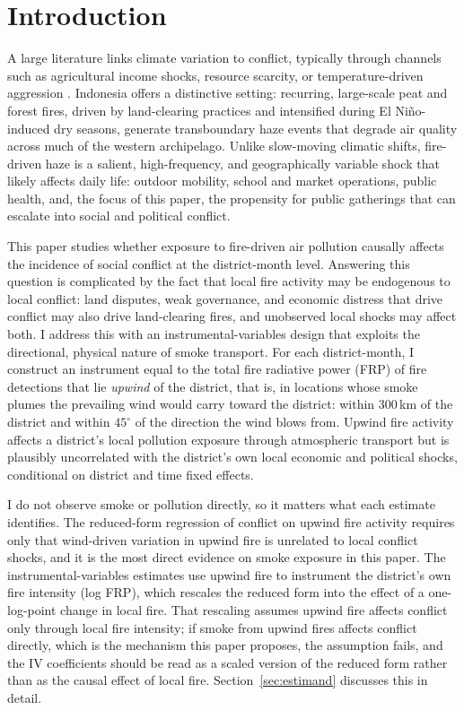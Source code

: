 \documentclass[12pt]{article}
\begin{document}
\section{Introduction}

A large literature links climate variation to conflict, typically through channels such as agricultural income shocks, resource scarcity, or temperature-driven aggression \citep{hsiang2013quantifying}. Indonesia offers a distinctive setting: recurring, large-scale peat and forest fires, driven by land-clearing practices and intensified during El Ni\~{n}o-induced dry seasons, generate transboundary haze events that degrade air quality across much of the western archipelago. Unlike slow-moving climatic shifts, fire-driven haze is a salient, high-frequency, and geographically variable shock that likely affects daily life: outdoor mobility, school and market operations, public health, and, the focus of this paper, the propensity for public gatherings that can escalate into social and political conflict.

This paper studies whether exposure to fire-driven air pollution causally affects the incidence of social conflict at the district-month level. Answering this question is complicated by the fact that local fire activity may be endogenous to local conflict: land disputes, weak governance, and economic distress that drive conflict may also drive land-clearing fires, and unobserved local shocks may affect both. I address this with an instrumental-variables design that exploits the directional, physical nature of smoke transport. For each district-month, I construct an instrument equal to the total fire radiative power (FRP) of fire detections that lie \emph{upwind} of the district, that is, in locations whose smoke plumes the prevailing wind would carry toward the district: within 300\,km of the district and within $45^{\circ}$ of the direction the wind blows from. Upwind fire activity affects a district's local pollution exposure through atmospheric transport but is plausibly uncorrelated with the district's own local economic and political shocks, conditional on district and time fixed effects.

I do not observe smoke or pollution directly, so it matters what each estimate identifies. The reduced-form regression of conflict on upwind fire activity requires only that wind-driven variation in upwind fire is unrelated to local conflict shocks, and it is the most direct evidence on smoke exposure in this paper. The instrumental-variables estimates use upwind fire to instrument the district's own fire intensity (log FRP), which rescales the reduced form into the effect of a one-log-point change in local fire. That rescaling assumes upwind fire affects conflict only through local fire intensity; if smoke from upwind fires affects conflict directly, which is the mechanism this paper proposes, the assumption fails, and the IV coefficients should be read as a scaled version of the reduced form rather than as the causal effect of local fire. Section~\ref{sec:estimand} discusses this in detail.
\end{document}
